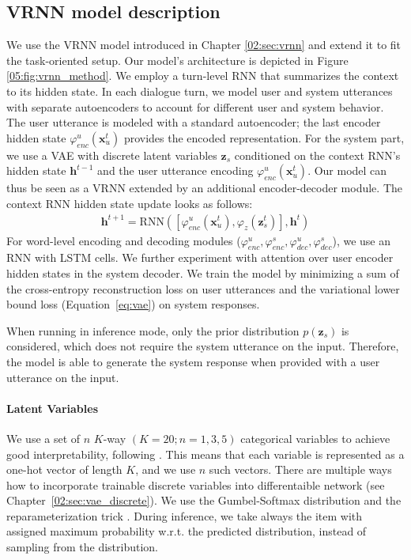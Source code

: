 \subsection{VRNN model description}
\label{05:sec:vrnn-model}
We use the VRNN model introduced in Chapter \ref{02:sec:vrnn} and extend it to fit the task-oriented setup.
Our model's architecture is depicted in Figure \ref{05:fig:vrnn_method}.
We employ a turn-level RNN that summarizes the context to its hidden state.
In each dialogue turn, we model user and system utterances with separate autoencoders to account for different user and system behavior.
The user utterance is modeled with a standard autoencoder; the last encoder hidden state $\varphi^u_{enc}(\mathbf{x}^t_u)$ provides the encoded representation.
For the system part, we use a VAE with discrete latent variables $\textbf{z}_s$ conditioned on the context RNN's hidden state $\mathbf{h}^{t-1}$ and the user utterance encoding $\varphi^u_{enc}(\mathbf{x}^t_u)$.
Our model can thus be seen as a VRNN extended by an additional encoder-decoder module.
The context RNN hidden state update looks as follows:
\begin{equation}
    \begin{gathered}
        \mathbf{h}^{t+1} = \text{RNN}([\varphi^u_{enc}(\mathbf{x}_u^t),\varphi_{z}(\mathbf{z}^t_s)], \mathbf{h}^t)
    \end{gathered}
\end{equation}
For word-level encoding and decoding modules ($\varphi_{enc}^u,\varphi_{enc}^s,\varphi_{dec}^u,\varphi_{dec}^s$), we use an RNN with LSTM cells.
We further experiment with attention \cite{bahdanau2014neural} over user encoder hidden states in the system decoder.
We train the model by minimizing a sum of the cross-entropy reconstruction loss on user utterances and the variational lower bound loss (Equation~\ref{eq:vae}) on system responses.

When running in inference mode, only the prior distribution $p(\mathbf{z}_s)$ is considered, which does not require the system utterance on the input.
Therefore, the model is able to generate the system response when provided with a user utterance on the input.

\paragraph{Latent Variables}
\label{05:sec:method_latent}
We use a set of $n$ \mbox{$K$-way} $(K=20;n=1,3,5)$ categorical variables to achieve good interpretability, following \citet{zhao2018unsupervised}.
This means that each variable is represented as a one-hot vector of length $K$, and we use $n$ such vectors.
There are multiple ways how to incorporate trainable discrete variables into differentaible network (see Chapter~\ref{02:sec:vae_discrete}).
We use the Gumbel-Softmax distribution and the reparameterization trick \cite{jang2017categorical}.
During inference, we take always the item with assigned maximum probability w.r.t. the predicted distribution, instead of sampling from the distribution.

